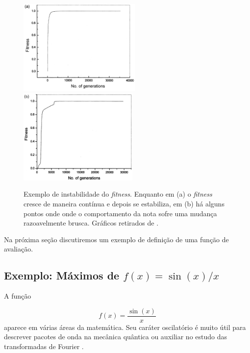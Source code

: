 	\begin{figure}[htp]
		\begin{center}
			\includegraphics[height=4.7cm]{figs/ga/func_aval_estavel.png}
			\includegraphics[height=4.7cm]{figs/ga/func_aval_instavel.png}
		\end{center}
		\caption{\label{figFitness}Exemplo de instabilidade do \textit{fitness}. Enquanto em (a) o \textit{fitness} cresce de maneira contínua e depois se estabiliza, em (b) há alguns pontos onde onde o comportamento da nota sofre uma mudança razoavelmente brusca. Gráficos retirados de \cite{Bhattacharyya2004}.}
	\end{figure}

	Na próxima seção discutiremos um exemplo de definição de uma função de avaliação.
		
	\subsection{\label{MaxSeno}Exemplo: Máximos de $f(x) = \sin(x) / x$}
	
	A função
	
	\begin{equation}\label{eqSinX}
		f(x) = \frac{\sin(x)}{x}
	\end{equation}
	aparece em várias áreas da matemática. Seu caráter oscilatório é muito útil para descrever pacotes de onda na mecânica quântica \cite{QuGA2006} ou auxiliar no estudo das transformadas de Fourier \cite{James2002}.
	
